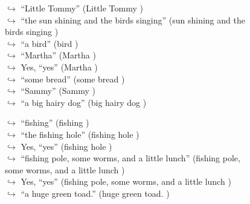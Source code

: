 \documentclass[11pt,a4paper, onecolumn]{article}
\begin{document}
\begin{figure}[t] \small \begin{tcolorbox}[boxsep=0pt,left=5pt,right=0pt,top=2pt,colback = yellow!5] \begin{dialogue}
 \small 
\colorbox{pink!25}{$\hookrightarrow$}
{ ``Little Tommy'' (Little Tommy ) }
\\
\colorbox{pink!25}{$\hookrightarrow$}
{ ``the sun shining and the birds singing'' (sun shining and the birds singing ) }
\\
\colorbox{pink!25}{$\hookrightarrow$}
{ ``a bird'' (bird ) }
\\
\colorbox{pink!25}{$\hookrightarrow$}
{ ``Martha'' (Martha ) }
\\
\colorbox{pink!25}{$\hookrightarrow$}
\colorbox{red!25}{Yes,}
{ ``yes'' (Martha ) }
\\
\colorbox{pink!25}{$\hookrightarrow$}
{ ``some bread'' (some bread ) }
\\
\colorbox{pink!25}{$\hookrightarrow$}
{ ``Sammy'' (Sammy ) }
\\
\colorbox{pink!25}{$\hookrightarrow$}
{ ``a big hairy dog'' (big hairy dog ) }
 \end{dialogue}\end{tcolorbox}\end{figure}\begin{figure}[t] \small \begin{tcolorbox}[boxsep=0pt,left=5pt,right=0pt,top=2pt,colback = yellow!5] \begin{dialogue}
 \small 
\colorbox{pink!25}{$\hookrightarrow$}
{ ``fishing'' (fishing ) }
\\
\colorbox{pink!25}{$\hookrightarrow$}
{ ``the fishing hole'' (fishing hole ) }
\\
\colorbox{pink!25}{$\hookrightarrow$}
\colorbox{red!25}{Yes,}
{ ``yes'' (fishing hole ) }
\\
\colorbox{pink!25}{$\hookrightarrow$}
{ ``fishing pole, some worms, and a little lunch'' (fishing pole, some worms, and a little lunch ) }
\\
\colorbox{pink!25}{$\hookrightarrow$}
\colorbox{red!25}{Yes,}
{ ``yes'' (fishing pole, some worms, and a little lunch ) }
\\
\colorbox{pink!25}{$\hookrightarrow$}
{ ``a huge green toad.'' (huge green toad. ) }
\\
 \end{dialogue}\end{tcolorbox}\end{figure}
\end{document}
